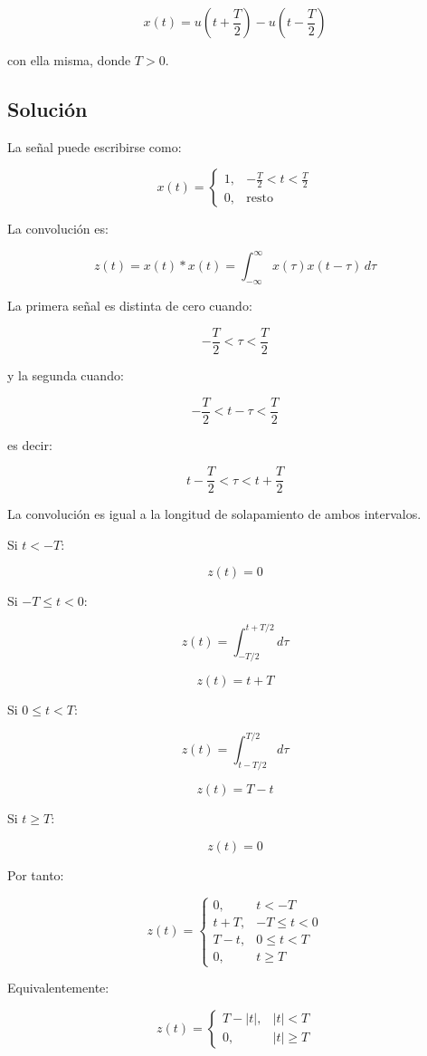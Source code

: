 \documentclass[fleqn]{article}
\begin{document}
	\[
	x(t)
	=
	u\left(t+\frac{T}{2}\right)
	-
	u\left(t-\frac{T}{2}\right)
	\]

	con ella misma, donde $T>0$.

	\subsection{Solución}

	La señal puede escribirse como:

	\[
	x(t)=
	\begin{cases}
	1, & -\frac{T}{2}<t<\frac{T}{2} \\[1mm]
	0, & \text{resto}
	\end{cases}
	\]

	La convolución es:

	\[
	z(t)
	=
	x(t)*x(t)
	=
	\int_{-\infty}^{\infty}
	x(\tau)x(t-\tau)\,d\tau
	\]

	La primera señal es distinta de cero cuando:

	\[
	-\frac{T}{2}<\tau<\frac{T}{2}
	\]

	y la segunda cuando:

	\[
	-\frac{T}{2}<t-\tau<\frac{T}{2}
	\]

	es decir:

	\[
	t-\frac{T}{2}<\tau<t+\frac{T}{2}
	\]

	La convolución es igual a la longitud de solapamiento de ambos intervalos.

	Si $t<-T$:

	\[
	z(t)=0
	\]

	Si $-T\leq t<0$:

	\[
	z(t)
	=
	\int_{-T/2}^{t+T/2}d\tau
	\]

	\[
	z(t)
	=
	t+T
	\]

	Si $0\leq t<T$:

	\[
	z(t)
	=
	\int_{t-T/2}^{T/2}d\tau
	\]

	\[
	z(t)
	=
	T-t
	\]

	Si $t\geq T$:

	\[
	z(t)=0
	\]

	Por tanto:

	\[
	\boxed{
	z(t)=
	\begin{cases}
	0, & t<-T \\[1mm]
	t+T, & -T\leq t<0 \\[1mm]
	T-t, & 0\leq t<T \\[1mm]
	0, & t\geq T
	\end{cases}
	}
	\]

	Equivalentemente:

	\[
	\boxed{
	z(t)=
	\begin{cases}
	T-|t|, & |t|<T \\[1mm]
	0, & |t|\geq T
	\end{cases}
	}
	\]
\end{document}
